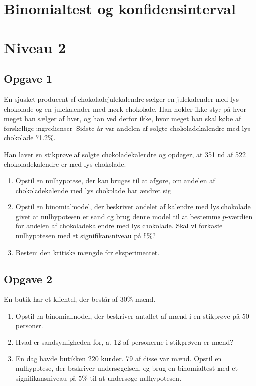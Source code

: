 \documentclass[12pt]{article}
\begin{document}
\newpage

\section*{Binomialtest og konfidensinterval}

\section*{Niveau 2}

\subsection*{Opgave 1}
En sjusket producent af chokoladejulekalendre sælger en julekalender med lys chokolade og en julekalender med mørk chokolade. Han holder ikke styr på hvor meget han sælger af hver, og han ved derfor
ikke, hvor meget han skal købe af forskellige ingredienser. Sidste år var andelen af solgte chokoladekalendre med lys chokolade 71.2$\%$. 

Han laver en stikprøve af solgte chokoladekalendre og opdager, at 351 ud af 522 chokoladekalendre er med lys chokolade.
\begin{enumerate}[label=\roman*)]
	\item Opstil en nulhypotese, der kan bruges til at afgøre, om andelen af chokoladekalende med lys chokolade har ændret sig
	\item Opstil en binomialmodel, der beskriver andelet af kalendre med lys chokolade givet at nulhypotesen er sand og brug denne model til at bestemme $p$-værdien for andelen af chokoladekalendre med lys chokolade. Skal vi forkaste nulhypotesen med et signifikansniveau på 5$\%$?
	\item Bestem den kritiske mængde for eksperimentet.
\end{enumerate} 

\subsection*{Opgave 2}
En butik har et klientel, der består af $30\%$ mænd. 
\begin{enumerate}[label=\roman*)]
\item Opstil en binomialmodel, der beskriver antallet af mænd i en stikprøve på $50$ personer.
\item Hvad er sandsynligheden for, at 12 af personerne i stikprøven er mænd?
\item En dag havde butikken $220$ kunder. 79 af disse var mænd. Opstil en nulhypotese, der beskriver undersøgelsen, og brug en binomialtest med et signifikansniveau på $5\%$ til at undersøge nulhypotesen. 
\end{enumerate}
\end{document}
